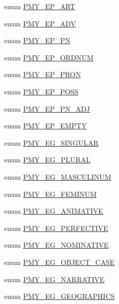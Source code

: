 \begin{DoxyCompactItemize}
\item 
enum \hyperlink{gramtab__consts_8php_a456d9db54f767292e5fe16c20fdde0ee}{PMY\_\-EP\_\-ART} 
\item 
enum \hyperlink{gramtab__consts_8php_aaa99114a3821fca93987f48e4387dd96}{PMY\_\-EP\_\-ADV} 
\item 
enum \hyperlink{gramtab__consts_8php_a1f2f97e3cb6b3aa797f7f0e41b9e0f10}{PMY\_\-EP\_\-PN} 
\item 
enum \hyperlink{gramtab__consts_8php_a6da60dd28b6c2538f8c8c507e91dd373}{PMY\_\-EP\_\-ORDNUM} 
\item 
enum \hyperlink{gramtab__consts_8php_a3176b2471f7a482881a0107fc1decdf4}{PMY\_\-EP\_\-PRON} 
\item 
enum \hyperlink{gramtab__consts_8php_ad98058d51b27b44ab4dceca874d350e1}{PMY\_\-EP\_\-POSS} 
\item 
enum \hyperlink{gramtab__consts_8php_aadd403417b3031abf10056b88bed7842}{PMY\_\-EP\_\-PN\_\-ADJ} 
\item 
enum \hyperlink{gramtab__consts_8php_a8c782355c852654ed96f18a73db8c855}{PMY\_\-EP\_\-EMPTY} 
\item 
enum \hyperlink{gramtab__consts_8php_a1d43e36820ae46938fdbdeca8e78e9ab}{PMY\_\-EG\_\-SINGULAR} 
\item 
enum \hyperlink{gramtab__consts_8php_a98b26b667d2325ae951f5451959a0c3c}{PMY\_\-EG\_\-PLURAL} 
\item 
enum \hyperlink{gramtab__consts_8php_af3118d3201f6e194218c02fd59e5a8ae}{PMY\_\-EG\_\-MASCULINUM} 
\item 
enum \hyperlink{gramtab__consts_8php_a4d152e7c645aabdd1dfecde0427e2c6b}{PMY\_\-EG\_\-FEMINUM} 
\item 
enum \hyperlink{gramtab__consts_8php_a5e88a692bcd0c4c8efc6ea67cc17e13f}{PMY\_\-EG\_\-ANIMATIVE} 
\item 
enum \hyperlink{gramtab__consts_8php_a5f6a9b3bd3678119bfb87573eaf23b99}{PMY\_\-EG\_\-PERFECTIVE} 
\item 
enum \hyperlink{gramtab__consts_8php_a3ab7b6b8ecb5da6208e940822e9d641b}{PMY\_\-EG\_\-NOMINATIVE} 
\item 
enum \hyperlink{gramtab__consts_8php_a924a39eee2a317ad29093c148bd6a31e}{PMY\_\-EG\_\-OBJECT\_\-CASE} 
\item 
enum \hyperlink{gramtab__consts_8php_aebe0c112ec6b2aee53a632d0d196568c}{PMY\_\-EG\_\-NARRATIVE} 
\item 
enum \hyperlink{gramtab__consts_8php_a46ba2bbea9511f091075a9176c235330}{PMY\_\-EG\_\-GEOGRAPHICS} 
\item 

\end{DoxyCompactItemize}
